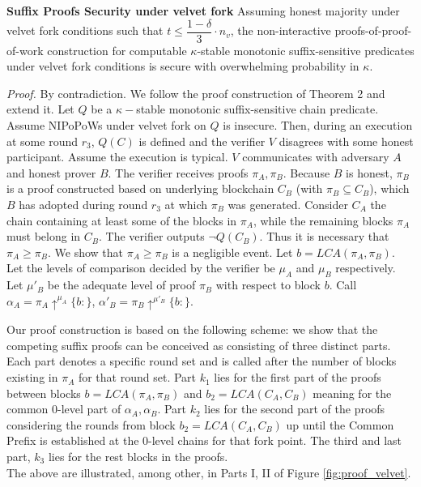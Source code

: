 \begin{thm}{\textbf{Suffix Proofs Security under velvet fork}}
	Assuming honest majority under velvet fork conditions such that $t \leq \dfrac{1 - \delta}{3}\cdot n_v$, the non-interactive proofs-of-proof-of-work construction for computable $\kappa$-stable monotonic suffix-sensitive predicates under velvet fork conditions is secure with overwhelming probability in $\kappa$.
\end{thm}
\textit{Proof.} By contradiction. We follow the proof construction of Theorem 2
and extend it. Let $Q$ be a $\kappa-$stable monotonic suffix-sensitive chain
predicate. Assume NIPoPoWs under velvet fork on $Q$ is insecure. Then, during
an execution at some round  $r_3$, $Q(C)$ is defined and the verifier $V$
disagrees with some honest participant. Assume the execution is typical. $V$
communicates with adversary $A$ and honest prover $B$. The verifier receives
proofs $\pi_A, \pi_B$. Because $B$ is honest, $\pi_B$ is a proof constructed
based on underlying blockchain $C_B$ (with $\pi_B \subseteq C_B$), which $B$
has adopted during round $r_3$ at which $\pi_B$ was generated. Consider $C_A$
the chain containing at least some of the blocks in $\pi_A$, while the remaining
blocks $\pi_A$ must belong in $C_B$.
The verifier outputs $\neg Q(C_B)$. Thus it is necessary that $\pi_A \geq \pi_B$.
We show that $\pi_A \geq \pi_B$ is a negligible event.
Let $b = LCA(\pi_A, \pi_B)$. Let the levels of comparison decided by the verifier
be $\mu_A$ and $\mu_B$ respectively. Let $\mu'_B$ be the adequate level of proof
$\pi_B$  with respect to block $b$. Call $\alpha_A = \pi_A \uparrow^{\mu_A}\{b:\}$,
$\alpha'_B = \pi_B \uparrow^{\mu'_B}\{b:\}$.

Our proof construction is based on the following scheme: we show that the competing
suffix proofs can be conceived as consisting of three distinct parts. Each part
denotes a specific round set and is called after the number of blocks existing
in $\pi_A$ for that round set. Part $k_1$ lies for the first part of the proofs
between blocks $b = LCA(\pi_A, \pi_B)$ and $b_2 = LCA(C_A, C_B)$ meaning for the
common 0-level part of $\alpha_A,  \alpha_B$. Part $k_2$ lies for the second part
of the proofs considering the rounds from block $b_2 = LCA(C_A, C_B)$ up until
the Common Prefix is established at the 0-level chains for that fork point.
The third and last part, $k_3$ lies for the rest blocks in the proofs.\\
The above are illustrated, among other, in Parts I, II of Figure \ref{fig:proof_velvet}.

